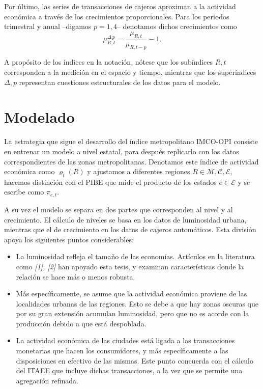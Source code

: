 \documentclass[]{article}
\begin{document}
Por último, las series de transacciones de cajeros aproximan a la
actividad económica a través de los crecimientos proporcionales. Para
los periodos trimestral y anual --digamos \(p = 1,4\)-- denotamos dichos
crecimientos como\\
\[ \mu_{R,t}^{\Delta\,p} = \frac{\mu_{R,t}}{\mu_{R,t-p}} - 1.\]

A propósito de los índices en la notación, nótese que los subíndices
\(R,t\) corresponden a la medición en el espacio y tiempo, mientras que
los superíndices \(\Delta, p\) representan cuestiones estructurales de
los datos para el modelo.

\section{Modelado}\label{modelado}

La estrategia que sigue el desarrollo del índice metropolitano IMCO-OPI
consiste en entrenar un modelo a nivel estatal, para después replicarlo
con los datos correspondientes de las zonas metropolitanas. Denotamos
este índice de actividad económica como \(\varrho_{t}(R)\) y ajustamos a
diferentes regiones \(R \in \mathcal M, \mathcal{C}, \mathcal E\),
hacemos distinción con el PIBE que mide el producto de los estados
\(e \in \mathcal E\) y se escribe como \(\pi_{e,t}\).

A su vez el modelo se separa en dos partes que corresponden al nivel y
al crecimiento. El cálculo de niveles se basa en los datos de
luminosidad urbana, mientras que el de crecimiento en los datos de
cajeros automáticos. Esta división apoya los siguientes puntos
considerables:

\begin{itemize}
\item
  La luminosidad refleja el tamaño de las economías. Artículos en la
  literatura como \emph{{[}1{]}, {[}2{]}} han apoyado esta tesis, y
  examinan características donde la relación se hace más o menos
  robusta.
\item
  Más específicamente, se asume que la actividad económica proviene de
  las localidades urbanas de las regiones. Esto se debe a que hay zonas
  oscuras que por su gran extensión acumulan luminosidad, pero que no es
  acorde con la producción debido a que está despoblada.
\item
  La actividad económica de las ciudades está ligada a las transacciones
  monetarias que hacen los consumidores, y más específicamente a las
  disposiciones en efectivo de las mismas. Este punto concuerda con el
  cálculo del ITAEE que incluye dichas transacciones, a la vez que se
  permite una agregación refinada.
\end{itemize}
\end{document}
